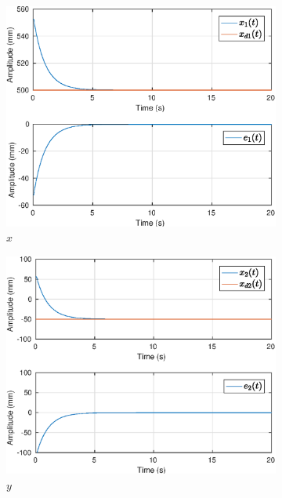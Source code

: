 \begin{figure}[H]
\centering
\begin{subfigure}{.5\textwidth}
  \centering
  \includegraphics[width=\linewidth]{./img/position1/x1.eps}
  \caption{$x$}
  \label{fig:oper_space_exp1_x1}
\end{subfigure}%
\begin{subfigure}{.5\textwidth}
  \centering
  \includegraphics[width=\linewidth]{./img/position1/x2.eps}
  \caption{$y$}
  \label{fig:oper_space_exp1_x2}
\end{subfigure}
\begin{subfigure}{.5\textwidth}

\end{subfigure}
\end{figure}
